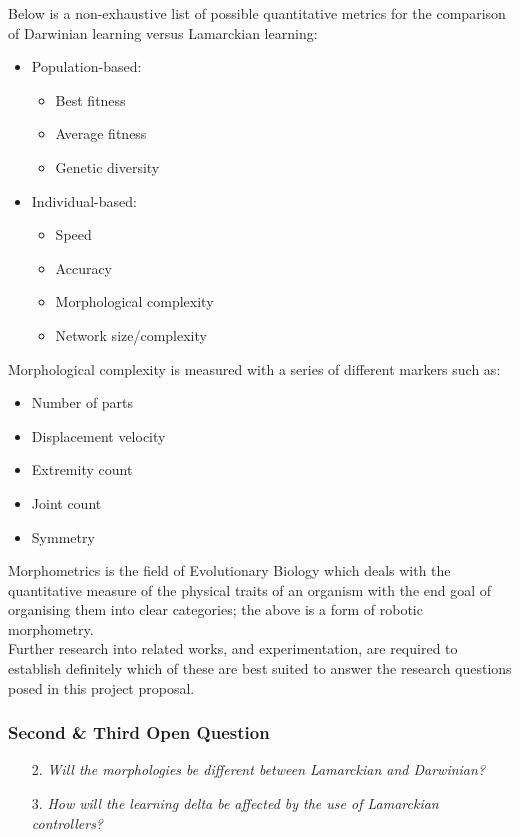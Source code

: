 \documentclass{scrartcl}
\begin{document}
Below is a non-exhaustive list of possible quantitative metrics for the comparison of Darwinian learning versus Lamarckian learning:

\begin{itemize}
    \item Population-based:
    \begin{itemize}
        \item Best fitness
        \item Average fitness
        \item Genetic diversity
    \end{itemize}
    \item Individual-based:
    \begin{itemize}
        \item Speed
        \item Accuracy
        \item Morphological complexity
        \item Network size/complexity
    \end{itemize}
\end{itemize}

Morphological complexity is measured with a series of different markers such as:

\begin{itemize}
    \item Number of parts
    \item Displacement velocity
    \item Extremity count
    \item Joint count
    \item Symmetry
\end{itemize}

Morphometrics is the field of Evolutionary Biology which deals with the quantitative measure of the physical traits of an organism with the end goal of organising them into clear categories; the above is a form of robotic morphometry. \\

Further research into related works, and experimentation, are required to establish definitely which of these are best suited to answer the research questions posed in this project proposal.

\subsubsection{Second \& Third Open Question}

\begin{itemize}
    \item[2.] \textit{Will the morphologies be different between Lamarckian and Darwinian?}
    \item[3.] \textit{How will the learning delta be affected by the use of Lamarckian controllers?}
\end{itemize}
\end{document}

